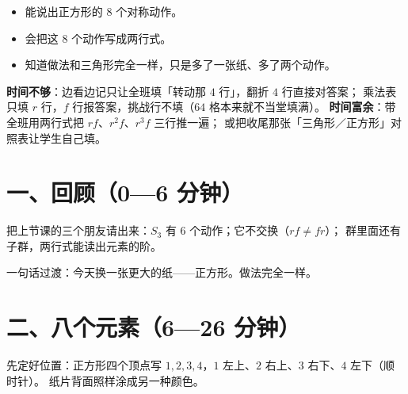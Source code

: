 

\begin{mubiao}
  \begin{itemize}
    \item 能说出正方形的 \(8\) 个对称动作。
    \item 会把这 \(8\) 个动作写成两行式。
    \item 知道做法和三角形完全一样，只是多了一张纸、多了两个动作。
  \end{itemize}
\end{mubiao}


\begin{beifen}
  \textbf{时间不够}：边看边记只让全班填「转动那 \(4\) 行」，翻折 \(4\) 行直接对答案；
  乘法表只填 \(r\) 行，\(f\) 行报答案，挑战行不填（\(64\) 格本来就不当堂填满）。
  \textbf{时间富余}：带全班用两行式把 \(rf\)、\(r^2f\)、\(r^3f\) 三行推一遍；
  或把收尾那张「三角形／正方形」对照表让学生自己填。
\end{beifen}

\section*{一、回顾（0—6 分钟）}

把上节课的三个朋友请出来：\(S_3\) 有 \(6\) 个动作；它不交换（\(rf\neq fr\)）；
群里面还有子群，两行式能读出元素的阶。

一句话过渡：今天换一张更大的纸——正方形。做法完全一样。

\section*{二、八个元素（6—26 分钟）}

先定好位置：正方形四个顶点写 \(1,2,3,4\)，\(1\) 左上、\(2\) 右上、\(3\) 右下、\(4\) 左下（顺时针）。
纸片背面照样涂成另一种颜色。

